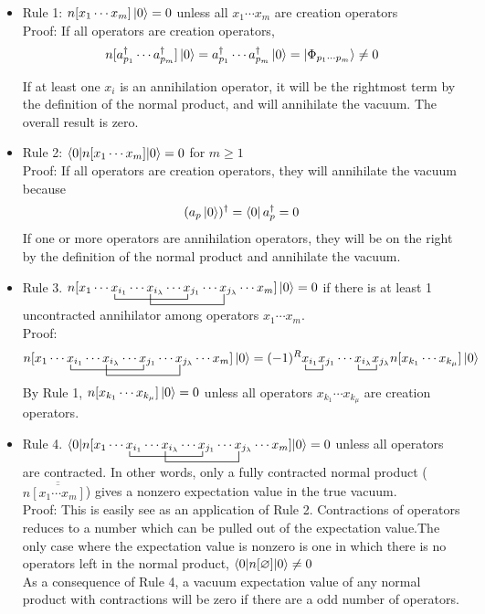 \documentclass{article}
\newcommand{\ol}{\overline}
\newcommand{\ctr}{\bcontraction}
\newcommand{\dg}{\ensuremath{^\dagger} }
\newcommand{\cd}{\ensuremath{\cdots} }
\begin{document}
\begin{itemize}
\item Rule 1: $n[x_1 \cd x_m]\ket{0} = 0$ unless all $x_1 \cd x_m$ are creation operators \\

Proof: If all operators are creation operators, 
\[n[a_{p_1}\dg \cd a_{p_m}\dg]\ket{0} = a_{p_1}\dg \cd a_{p_m}\dg\ket{0} = \ket{\Phi_{p_1 \cd p_m}} \neq 0\]

If at least one $x_i$ is an annihilation operator, it will be the rightmost term by the definition of the normal product, and will annihilate the vacuum.
The overall result is zero.  
\item Rule 2: $\braket{0 | n[x_1 \cd x_m] | 0} = 0$ for  $m \geq 1$ \\

Proof: If all operators are creation operators, they will annihilate the vacuum because 
\[(a_p\ket{0})\dg = \bra{0}a_p\dg = 0\]
If one or more operators are annihilation operators, they will be on the right by the definition of the normal product and annihilate the vacuum. 
\item Rule 3. $\ctr{n[x_1 \cd }{x}{{}_{i_1} \cd x_{i_\lambda} \cd }{x}
\ctr[2ex]{n[x_1 \cd x_{i_1} \cd}{ x}{{}_{i_\lambda} \cd x_{j_1} \cd }{x} 
n[x_1 \cd x_{i_1} \cd x_{i_\lambda} \cd x_{j_1} \cd x_{j_\lambda} \cd x_m] \ket{0} = 0$ if there is at least 1 uncontracted annihilator among operators $x_1 \cd x_m$.  \\

Proof:
\[ 
\ctr{n[x_1 \cd }{x}{{}_{i_1} \cd x_{i_\lambda} \cd }{x}
\ctr[2ex]{n[x_1 \cd x_{i_1} \cd}{ x}{{}_{i_\lambda} \cd x_{j_1} \cd }{x} 
n[x_1 \cd x_{i_1} \cd x_{i_\lambda} \cd x_{j_1} \cd x_{j_\lambda} \cd x_m] \ket{0}
= 
\ctr{(-1)^R}{x}{{}_{i_1} }{x}
\ctr{(-1)^R x_{i_1}x_{j_1} \cd}{x}{{}_{i_\lambda} }{x}
(-1)^R x_{i_1}x_{j_1} \cd x_{i_\lambda} x_{j_\lambda} n[x_{k_1} \cd x_{k_\mu}] \ket{0}
\] 
By Rule 1, $n[x_{k_1} \cd x_{k_\mu}] \ket{0} = 0$ unless all operators $x_{k_1} \cd x_{k_\mu}$ are creation operators. 
\item Rule 4. $\braket{0| \ctr{n[x_1 \cd }{x}{{}_{i_1} \cd x_{i_\lambda} \cd }{x}
\ctr[2ex]{n[x_1 \cd x_{i_1} \cd}{ x}{{}_{i_\lambda} \cd x_{j_1} \cd }{x} 
n[x_1 \cd x_{i_1} \cd x_{i_\lambda} \cd x_{j_1} \cd x_{j_\lambda} \cd x_m] |0} = 0$ unless all operators are contracted. 
In other words, only a fully contracted normal product ($n\ol{\ol{[x_1 \cd x_m] }}$) gives a nonzero expectation value in the true vacuum. \\

Proof: This is easily see as an application of Rule 2. Contractions of operators reduces to a number which can be pulled out of the expectation value.The only case where the expectation value is nonzero is one in which there is no operators left in the normal product, $\braket{0 | n[\varnothing] | 0} \neq 0$ \\

As a consequence of Rule 4, a vacuum expectation value of any normal product with contractions will be zero if there are a odd number of operators. 
\end{itemize}
\end{document}
